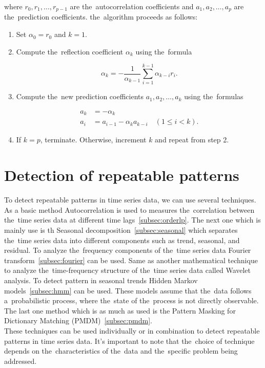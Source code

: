 where $r_0, r_1, \ldots, r_{p-1}$ are the~autocorrelation coefficients and $a_1, a_2, \ldots, a_p$ are the~prediction coefficients. the~algorithm proceeds as follows:\\

\begin{enumerate}
    \item Set $\alpha_0 = r_0$ and $k = 1$.
    \item Compute the~reflection coefficient $\alpha_k$ using the~formula

    \begin{equation*}
        \alpha_k = -\frac{1}{\alpha_{k-1}} \sum_{i=1}^{k-1} \alpha_{k-i} r_i.
    \end{equation*}

    \item Compute the~new prediction coefficients $a_1, a_2, \ldots, a_k$ using the~formulas

    \begin{align*}
        a_k &= -\alpha_k \\
        a_i &= a_{i-1} - \alpha_k a_{k-i} \quad (1 \leq i < k).
    \end{align*}

    \item If $k = p$, terminate. Otherwise, increment $k$ and repeat from step 2.
\end{enumerate}


\section{Detection of repeatable patterns}\label{sec:patterns}
To detect repeatable patterns in time series data, we can use several techniques. As a basic method Autocorrelation is used to measures the~correlation between the~time series data at different time lags~\ref{subsec:orderlp}. The next one which is mainly use is th Seasonal decomposition~\ref{subsec:seasonal} which separates the~time series data into different components
such as trend, seasonal, and residual. To analyze the~frequency components of the~time series data Fourier transform~\ref{subsec:fourier} can be used. Same as another mathematical technique to analyze the~time-frequency structure of the~time series data called Wavelet analysis.
To detect pattern in seasonal trends Hidden Markov models~\ref{subsec:hmm} can be used.
These models assume that the~data follows a~probabilistic process, where the~state of the~process is not directly observable. The last one method which is as much as used is the Pattern Masking for Dictionary Matching (PMDM)~\ref{subsec:pmdm}.\\
These techniques can be used individually or in combination to detect repeatable patterns in time series data. It's important to note that the~choice of technique depends on the~characteristics of the~data and the~specific problem being addressed.



